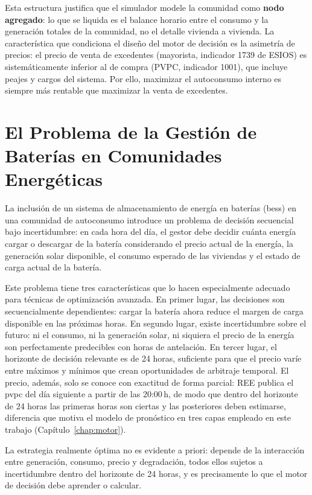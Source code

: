 \documentclass[12pt, a4paper, twoside]{report}
\begin{document}
Esta estructura justifica que el simulador modele la comunidad como
\textbf{nodo agregado}: lo que se liquida es el balance horario entre el consumo
y la generación totales de la comunidad, no el detalle vivienda a vivienda. La
característica que condiciona el diseño del motor de decisión es la asimetría de
precios: el precio de venta de excedentes (mayorista, indicador 1739 de ESIOS)
es sistemáticamente inferior al de compra (PVPC, indicador 1001), que incluye
peajes y cargos del sistema. Por ello, maximizar el autoconsumo interno es
siempre más rentable que maximizar la venta de excedentes.

\section{El Problema de la Gestión de Baterías en Comunidades Energéticas}

La inclusión de un sistema de almacenamiento de energía en baterías
(\acrshort{bess}) en una comunidad de autoconsumo introduce un problema de
decisión secuencial bajo incertidumbre: en cada hora del día, el gestor debe
decidir cuánta energía cargar o descargar de la batería considerando el precio
actual de la energía, la generación solar disponible, el consumo esperado de
las viviendas y el estado de carga actual de la batería.

Este problema tiene tres características que lo hacen especialmente adecuado
para técnicas de optimización avanzada. En primer lugar, las decisiones son
secuencialmente dependientes: cargar la batería ahora reduce el margen de carga
disponible en las próximas horas. En segundo lugar, existe incertidumbre sobre
el futuro: ni el consumo, ni la generación solar, ni siquiera el precio de la
energía son perfectamente predecibles con horas de antelación. En tercer lugar,
el horizonte de decisión relevante es de 24 horas, suficiente para que el precio
varíe entre máximos y mínimos que crean oportunidades de arbitraje temporal. El
precio, además, solo se conoce con exactitud de forma parcial: REE publica el
\acrshort{pvpc} del día siguiente a partir de las 20:00\,h, de modo que dentro
del horizonte de 24 horas las primeras horas son ciertas y las posteriores deben
estimarse, diferencia que motiva el modelo de pronóstico en tres capas empleado
en este trabajo (Capítulo~\ref{chap:motor}).

La estrategia realmente óptima no es evidente a priori: depende de la
interacción entre generación, consumo, precio y degradación, todos ellos
sujetos a incertidumbre dentro del horizonte de 24 horas, y es precisamente lo
que el motor de decisión debe aprender o calcular.
\end{document}
